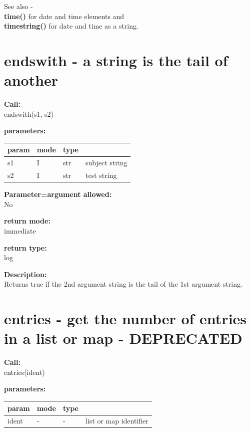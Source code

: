         See also - \\
         {\bf time()} for date and time elements and \\
         {\bf timestring()} for date and time as a
        string.


    \section{endswith - a string is the tail of another}\label{sec:ifendswith}
        
        {\bf Call:} \\
        endswith(s1, s2)
        
        {\bf parameters:} \\
        \begin{tabular}{| l | l | l | l |}
        \hline
        param  & mode & type & \\
        \hline \hline
        s1 & I & str & subject string   \\ \hline
        s2 & I & str & test string      \\ \hline
        \end{tabular}
        
        {\bf Parameter=argument allowed:} \\
        No
        
        {\bf return mode:} \\
        immediate

        {\bf return type:} \\
        log
        
        {\bf Description:} \\
        Returns true if the 2nd argument string is the tail
        of the 1st argument string.


    \section{entries - get the number of entries in a list or map - DEPRECATED}\label{sec:ifentries}
        
        {\bf Call:} \\
        entries(ident)
        
        {\bf parameters:} \\
        \begin{tabular}{| l | l | l | l |}
        \hline
        param  & mode & type & \\
        \hline \hline
        ident & - & -   & list or map identifier \\ \hline
        \end{tabular}
        
